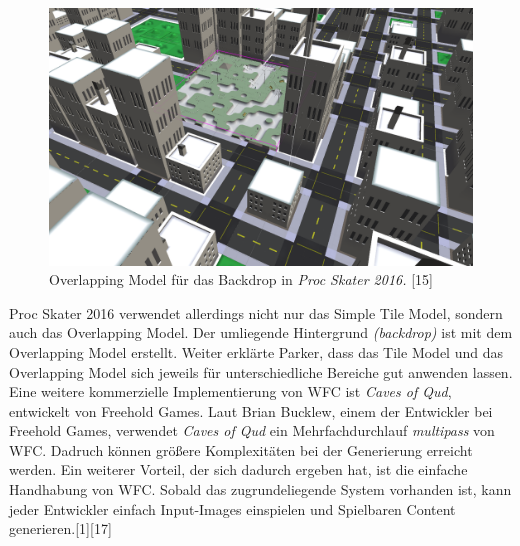 \documentclass[12pt]{report}
\begin{document}
\begin{figure}
    \includegraphics[width=1\linewidth]{images/proc-skate-backdrop.png}%
    \caption{Overlapping Model für das Backdrop in \textit{Proc Skater 2016.} {[15]}}%
\end{figure}

Proc Skater 2016 verwendet allerdings nicht nur das Simple Tile Model, sondern auch das Overlapping Model.
Der umliegende Hintergrund \textit{(backdrop)} ist mit dem Overlapping Model erstellt.
Weiter erklärte Parker, dass das Tile Model und das Overlapping Model sich jeweils für unterschiedliche Bereiche gut anwenden lassen.
\newline
Eine weitere kommerzielle Implementierung von WFC ist \textit{Caves of Qud}, entwickelt von Freehold Games.
Laut Brian Bucklew, einem der Entwickler bei Freehold Games, verwendet \textit{Caves of Qud} ein Mehrfachdurchlauf \textit{multipass} von WFC.
Dadruch können größere Komplexitäten bei der Generierung erreicht werden.
Ein weiterer Vorteil, der sich dadurch ergeben hat, ist die einfache Handhabung von WFC.
Sobald das zugrundeliegende System vorhanden ist, kann jeder Entwickler einfach Input-Images einspielen und Spielbaren Content generieren.{[1][17]}
\end{document}
